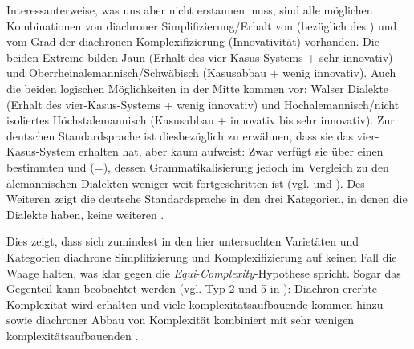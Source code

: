 Interessanterweise, was uns aber nicht erstaunen muss, sind alle möglichen Kombinationen von diachroner Simplifizierung/Erhalt von  (bezüglich des ) und vom Grad der diachronen Komplexifizierung (Innovativität) vorhanden. Die beiden Extreme bilden Jaun (Erhalt des vier-Kasus-Systems + sehr innovativ) und Oberrheinalemannisch/Schwäbisch (Kasusabbau + wenig innovativ). Auch die beiden logischen Möglichkeiten in der Mitte kommen vor: Walser Dialekte (Erhalt des vier-Kasus-Systems + wenig innovativ) und Hochalemannisch/nicht isoliertes Höchstalemannisch (Kasusabbau + innovativ bis sehr innovativ). Zur deutschen Standardsprache ist diesbezüglich zu erwähnen, dass sie das vier-Kasus-System erhalten hat, aber kaum  aufweist: Zwar verfügt sie über einen bestimmten und  (=), dessen Grammatikalisierung jedoch im Vergleich zu den alemannischen Dialekten weniger weit fortgeschritten ist (vgl.  und ). Des Weiteren zeigt die deutsche Standardsprache in den drei Kategorien, in denen die Dialekte  haben, keine weiteren .

Dies zeigt, dass sich zumindest in den hier untersuchten Varietäten und Kategorien diachrone Simplifizierung und Komplexifizierung auf keinen Fall die Waage halten, was klar gegen die \textit{Equi}{}-\textit{Complexity}{}-Hypothese spricht. Sogar das Gegenteil kann beobachtet werden (vgl. Typ 2 und 5 in ): Diachron ererbte Komplexität wird erhalten und viele komplexitätsaufbauende  kommen hinzu sowie diachroner Abbau von Komplexität kombiniert mit sehr wenigen komplexitätsaufbauenden .


